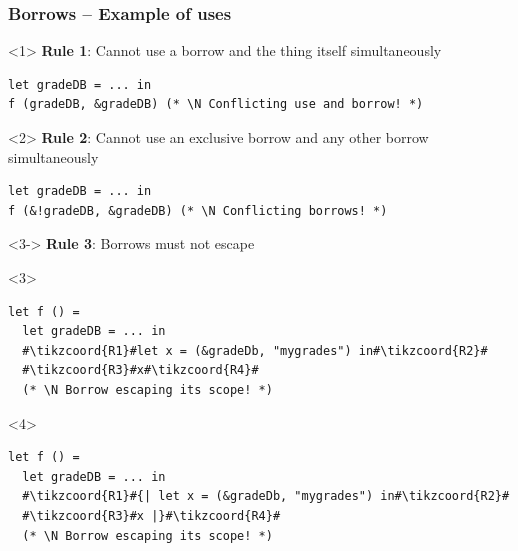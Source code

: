 \documentclass[aspectratio=169,dvipsnames,svgnames,10pt]{beamer}
\newcommand\Y{{\color{Green}{\ding{52}}}}
\newcommand\N{{\color{Red}{\ding{56}}}}
\begin{document}
\begin{frame}[fragile]
  \frametitle{Borrows -- Example of uses}

\begin{onlyenv}<1>
  \textbf{Rule 1}: Cannot use a borrow and the thing itself simultaneously
\begin{verbatim}
let gradeDB = ... in
f (gradeDB, &gradeDB) (* \N Conflicting use and borrow! *)
\end{verbatim}
\end{onlyenv}%
\begin{onlyenv}<2>
  \textbf{Rule 2}: Cannot use an exclusive borrow and any other borrow simultaneously
\begin{verbatim}
let gradeDB = ... in
f (&!gradeDB, &gradeDB) (* \N Conflicting borrows! *)
\end{verbatim}
\end{onlyenv}%
\begin{onlyenv}<3->
  \textbf{Rule 3}: Borrows must not escape
  \begin{onlyenv}<3>
\begin{verbatim}
let f () = 
  let gradeDB = ... in
  #\tikzcoord{R1}#let x = (&gradeDb, "mygrades") in#\tikzcoord{R2}#
  #\tikzcoord{R3}#x#\tikzcoord{R4}#
  (* \N Borrow escaping its scope! *)
\end{verbatim}
  \end{onlyenv}
  \begin{onlyenv}<4>
\begin{verbatim}
let f () = 
  let gradeDB = ... in
  #\tikzcoord{R1}#{| let x = (&gradeDb, "mygrades") in#\tikzcoord{R2}#
  #\tikzcoord{R3}#x |}#\tikzcoord{R4}#
  (* \N Borrow escaping its scope! *)
\end{verbatim}
  \end{onlyenv}
\end{onlyenv}%
\end{frame}
\end{document}
